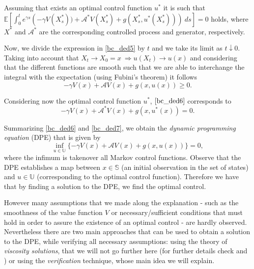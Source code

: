 Assuming that exists an optimal control function $u^*$ it is such that
$\mathds{E} \left[ \int^t_0  e^{\gamma s} \left( - \gamma V(X^*_s))+\mathcal{A}^*V(X^*_s)+g(X^*_s,u^*(X_s^*))\right) \ ds \right]=0$ holds, where $X^*$ and $\mathcal{A}^*$ are the corresponding controlled process and generator, respectively.
 
Now, we divide the expression in \eqref{bc_ded5} by $t$ and we take its limit as $t \downarrow 0$. Taking into account that $X_t \rightarrow X_0=x \ \Rightarrow u(X_t) \rightarrow u(x)$ and considering that the different functions are smooth such that we are able to 
interchange the integral with the expectation (using Fubini's theorem) it follows
\begin{equation}
 - \gamma V(x)+\mathcal{A}V(x)+g(x,u(x))\geq0.
 \label{bc_ded6}
\end{equation}

Considering now the optimal control function $u^*$, $\eqref{bc_ded6}$ corresponds to
\begin{equation}
- \gamma V(x)+\mathcal{A^*}V(x)+g(x,u^*(x))=0.
\label{bc_ded7}
\end{equation}

Summarizing \eqref{bc_ded6} and \eqref{bc_ded7}, we obtain the \textit{dynamic programming equation} (DPE) that is given by
\begin{equation}
	 \inf_{u \in \mathds{U}} \{  - \gamma V(x)+\mathcal{A}V(x)+g(x,u(x)) \}=0,
	 \label{bc_eq}
\end{equation}
where the infimum is takenover all Markov control functions.
Observe that the DPE establishes a map between $x \in \mathds{S}$ (an initial observation in the set of states) and $u \in \mathds{U}$ (corresponding to the optimal control function). Therefore we have that by finding a solution to the DPE, we find the optimal control.

However many assumptions that we made along the explanation - such as the smoothness of the value function $V$ or necessary/sufficient conditions that must hold in order to assure the existence of an optimal control - are hardly observed. Nevertheless there are two main approaches that can be used to obtain a solution to the DPE, while verifying all necessary assumptions: using the theory of \textit{viscosity solutions}, that we will not go further here (for further details check \cite{ross} and \cite{oksendal:book}) or using the \textit{verification} technique, whose main idea we will explain.



